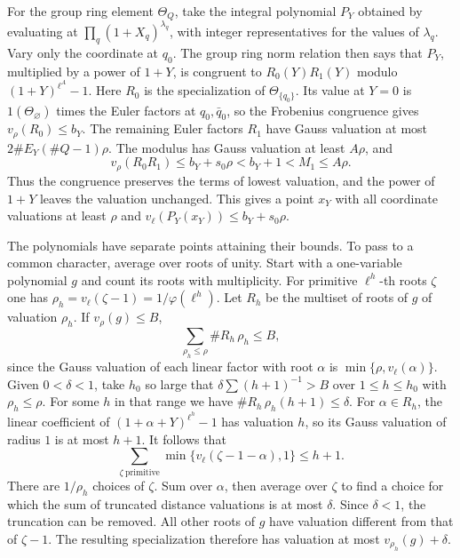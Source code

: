 For the group ring element \(\Theta_Q\), take the integral polynomial
\(P_Y\) obtained by evaluating at \(\prod_q(1+X_q)^{\lambda_q}\),
with integer representatives for the values of \(\lambda_q\).
Vary only the coordinate at \(q_0\). The group ring norm relation
then says that \(P_Y\), multiplied by a power of \(1+Y\), is congruent
to \(R_0(Y)R_1(Y)\) modulo \((1+Y)^{\ell^A}-1\).
Here \(R_0\) is the specialization of \(\Theta_{\{q_0\}}\).
Its value at \(Y=0\) is \(1(\Theta_\varnothing)\) times the Euler
factors at \(q_0,\bar q_0\), so the Frobenius congruence gives
\(v_\rho(R_0)\le b_Y\). The remaining Euler factors \(R_1\) have
Gauss valuation at most \(2\#E_Y(\#Q-1)\rho\). The modulus has
Gauss valuation at least \(A\rho\), and
\[
 v_\rho(R_0R_1)\le b_Y+s_0\rho<b_Y+1<M_1\le A\rho .
\]
Thus the congruence preserves the terms of lowest valuation, and the
power of \(1+Y\) leaves the valuation unchanged. This gives a point
\(x_Y\) with all coordinate valuations at least \(\rho\) and
\(v_\ell(P_Y(x_Y))\le b_Y+s_0\rho\).

The polynomials have separate points attaining their bounds. To pass
to a common character, average over roots of unity. Start with a
one-variable polynomial \(g\) and count its roots with multiplicity.
For primitive \(\ell^h\)-th roots \(\zeta\) one has
\(\rho_h=v_\ell(\zeta-1)=1/\varphi(\ell^h)\). Let \(R_h\) be the
multiset of roots of \(g\) of valuation \(\rho_h\). If \(v_\rho(g)\le B\),
\[
 \sum_{\rho_h\le\rho}\#R_h\,\rho_h\le B,
\]
since the Gauss valuation of each linear factor with root \(\alpha\)
is \(\min\{\rho,v_\ell(\alpha)\}\). Given \(0<\delta<1\), take
\(h_0\) so large that \(\delta\sum(h+1)^{-1}>B\) over
\(1\le h\le h_0\) with \(\rho_h\le\rho\). For some \(h\) in that range
we have \(\#R_h\,\rho_h(h+1)\le\delta\).
For \(\alpha\in R_h\), the linear coefficient of
\((1+\alpha+Y)^{\ell^h}-1\) has valuation \(h\), so its Gauss
valuation of radius \(1\) is at most \(h+1\). It follows that
\[
 \sum_{\zeta\ \mathrm{primitive}}
         \min\{v_\ell(\zeta-1-\alpha),1\}\le h+1 .
\]
There are \(1/\rho_h\) choices of \(\zeta\). Sum over \(\alpha\), then
average over \(\zeta\) to find a choice for which the sum of truncated
distance valuations is at most \(\delta\). Since \(\delta<1\), the
truncation can be removed. All other roots of \(g\) have valuation
different from that of \(\zeta-1\). The resulting specialization
therefore has valuation at most \(v_{\rho_h}(g)+\delta\).

